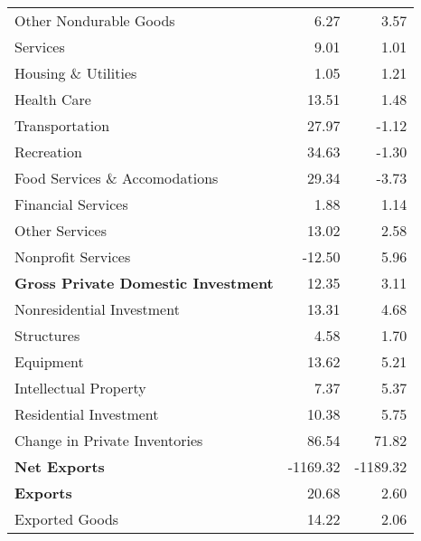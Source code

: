 \documentclass[11pt, letterpaper]{article}\usepackage[]{graphicx}\usepackage[]{color}
\begin{document}
\begin{table}[H]
\begin{tabular}{lrr}
  \hspace{24mm}  Other Nondurable Goods & 6.27 & 3.57 \\ 
  \hspace{8mm}  Services & 9.01 & 1.01 \\ 
  \hspace{16mm}  Housing \& Utilities & 1.05 & 1.21 \\ 
  \hspace{16mm}  Health Care & 13.51 & 1.48 \\ 
  \hspace{16mm}  Transportation & 27.97 & -1.12 \\ 
  \hspace{16mm}  Recreation & 34.63 & -1.30 \\ 
  \hspace{16mm}  Food Services \& Accomodations & 29.34 & -3.73 \\ 
  \hspace{16mm}  Financial Services & 1.88 & 1.14 \\ 
  \hspace{16mm}  Other Services & 13.02 & 2.58 \\ 
  \hspace{16mm}  Nonprofit Services & -12.50 & 5.96 \\ 
  \hspace{0mm} \textbf{Gross Private Domestic Investment} & 12.35 & 3.11 \\ 
  \hspace{8mm}  Nonresidential Investment & 13.31 & 4.68 \\ 
  \hspace{16mm}  Structures & 4.58 & 1.70 \\ 
  \hspace{16mm}  Equipment & 13.62 & 5.21 \\ 
  \hspace{16mm}  Intellectual Property & 7.37 & 5.37 \\ 
  \hspace{8mm}  Residential Investment & 10.38 & 5.75 \\ 
  \hspace{8mm}  Change in Private Inventories & 86.54 & 71.82 \\ 
  \hspace{0mm} \textbf{Net Exports} & -1169.32 & -1189.32 \\ 
  \hspace{0mm} \textbf{Exports} & 20.68 & 2.60 \\ 
  \hspace{8mm}  Exported Goods & 14.22 & 2.06 \\ 

\end{tabular}
\end{table}
\end{document}
